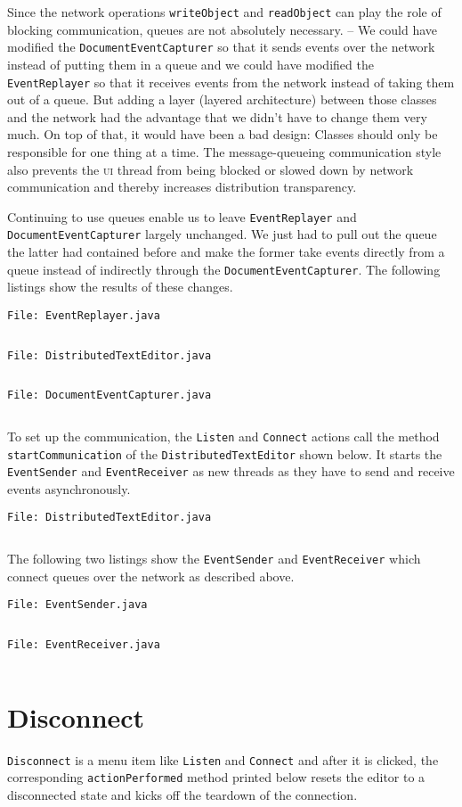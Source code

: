 \documentclass[a4paper,draft,12pt,oneside,article,table]{memoir}
\newcommand{\srcpath}{../ex09/src/main/java/ddist}
\newcommand{\inmnt}[3]{\noindent\texttt{\color{gray}File: #3}\vspace{-1em}\inputminted[tabsize=4,firstline=#1,firstnumber=#1,lastline=#2,linenos]{java}{\srcpath/#3}}
\newcommand{\mil}[1]{\texttt{#1}}
\begin{document}
Since the network operations \mil{writeObject} and \mil{readObject} can
play the role of blocking communication, queues are not absolutely
necessary. -- We could have modified the \mil{DocumentEventCapturer} so
that it sends events over the network instead of putting them in a queue
and we could have modified the \mil{EventReplayer} so that it receives
events from the network instead of taking them out of a queue. But
adding a layer (layered architecture) between those classes and the
network had the advantage that we didn't have to change them very much.
On top of that, it would have been a bad design: Classes should only be
responsible for one thing at a time. The message-queueing communication
style also prevents the \textsc{ui} thread from being blocked or slowed
down by network communication and thereby increases distribution
transparency.

Continuing to use queues enable us to leave \mil{EventReplayer} and
\mil{DocumentEventCapturer} largely unchanged. We just had to pull out
the queue the latter had contained before and make the former take
events directly from a queue instead of indirectly through the
\mil{DocumentEventCapturer}. The following listings show the results of
these changes.

\inmnt{1}{1000}{EventReplayer.java}

\inmnt{43}{67}{DistributedTextEditor.java}

\inmnt{30}{39}{DocumentEventCapturer.java}

To set up the communication, the \mil{Listen} and \mil{Connect} actions
call the method \mil{startCommunication} of the
\mil{DistributedTextEditor} shown below. It starts the \mil{EventSender}
and \mil{EventReceiver} as new threads as they have to send and receive
events asynchronously.

\inmnt{300}{318}{DistributedTextEditor.java}

The following two listings show the \mil{EventSender} and
\mil{EventReceiver} which connect queues over the network as described
above.

\inmnt{1}{1000}{EventSender.java}

\inmnt{1}{1000}{EventReceiver.java}

\section{Disconnect}

\mil{Disconnect} is a menu item like \mil{Listen} and \mil{Connect} and
after it is clicked, the corresponding \mil{actionPerformed} method
printed below resets the editor to a disconnected state and kicks off
the teardown of the connection.
\end{document}
